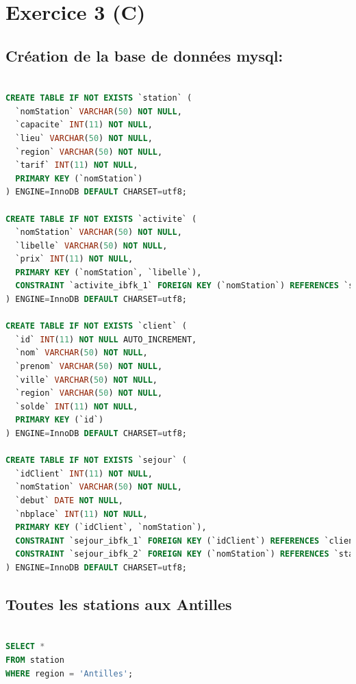 \documentclass{article}
\begin{document}
\section{Exercice 3 (C)}

\subsection*{Création de la base de données mysql:}

\begin{lstlisting}[language=SQL]

CREATE TABLE IF NOT EXISTS `station` (
  `nomStation` VARCHAR(50) NOT NULL,
  `capacite` INT(11) NOT NULL,
  `lieu` VARCHAR(50) NOT NULL,
  `region` VARCHAR(50) NOT NULL,
  `tarif` INT(11) NOT NULL,
  PRIMARY KEY (`nomStation`)
) ENGINE=InnoDB DEFAULT CHARSET=utf8;

CREATE TABLE IF NOT EXISTS `activite` (
  `nomStation` VARCHAR(50) NOT NULL,
  `libelle` VARCHAR(50) NOT NULL,
  `prix` INT(11) NOT NULL,
  PRIMARY KEY (`nomStation`, `libelle`),
  CONSTRAINT `activite_ibfk_1` FOREIGN KEY (`nomStation`) REFERENCES `station` (`nomStation`)
) ENGINE=InnoDB DEFAULT CHARSET=utf8;

CREATE TABLE IF NOT EXISTS `client` (
  `id` INT(11) NOT NULL AUTO_INCREMENT,
  `nom` VARCHAR(50) NOT NULL,
  `prenom` VARCHAR(50) NOT NULL,
  `ville` VARCHAR(50) NOT NULL,
  `region` VARCHAR(50) NOT NULL,
  `solde` INT(11) NOT NULL,
  PRIMARY KEY (`id`)
) ENGINE=InnoDB DEFAULT CHARSET=utf8;

CREATE TABLE IF NOT EXISTS `sejour` (
  `idClient` INT(11) NOT NULL,
  `nomStation` VARCHAR(50) NOT NULL,
  `debut` DATE NOT NULL,
  `nbplace` INT(11) NOT NULL,
  PRIMARY KEY (`idClient`, `nomStation`),
  CONSTRAINT `sejour_ibfk_1` FOREIGN KEY (`idClient`) REFERENCES `client` (`id`),
  CONSTRAINT `sejour_ibfk_2` FOREIGN KEY (`nomStation`) REFERENCES `station` (`nomStation`)
) ENGINE=InnoDB DEFAULT CHARSET=utf8;

\end{lstlisting}

\subsection{Toutes les stations aux Antilles}

\begin{lstlisting}[language=SQL]

SELECT * 
FROM station 
WHERE region = 'Antilles';

\end{lstlisting}
\end{document}
